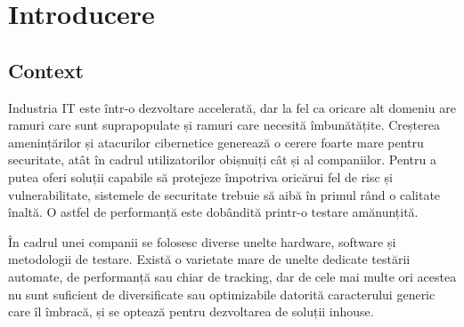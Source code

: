 
\chapter{Introducere}
\label{cap:Introducere}



\section{Context}

Industria IT este într-o dezvoltare accelerată, dar la fel ca oricare alt domeniu are ramuri care sunt suprapopulate și ramuri care necesită îmbunătățite. Creșterea amenințărilor și atacurilor cibernetice generează o cerere foarte mare pentru securitate, atât în cadrul utilizatorilor obișnuiți cât și al companiilor. Pentru a putea oferi soluții capabile să protejeze împotriva oricărui fel de risc și vulnerabilitate, sistemele de securitate trebuie să aibă în primul rând o calitate înaltă. O astfel de performanță este dobândită printr-o testare amănunțită.

În cadrul unei companii se folosesc diverse unelte hardware, software și metodologii de testare. Există o varietate mare de unelte dedicate testării automate, de performanță sau chiar de tracking, dar de cele mai multe ori acestea nu sunt suficient de diversificate sau optimizabile datorită caracterului generic care îl îmbracă, și se optează pentru dezvoltarea de soluții inhouse.

